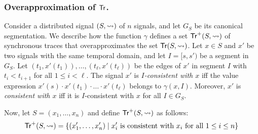 \subsubsection{Overapproximation of $\mathsf{Tr}$.}
Consider a distributed signal $(S,{\rightsquigarrow})$ of $n$ signals, and let $G_S$ be its canonical segmentation.
We describe how the function $\gamma$ defines a set $\mathsf{Tr}^+(S,{\rightsquigarrow})$ of synchronous traces that overapproximates the set $\mathsf{Tr}(S,{\rightsquigarrow})$.
%
%
%
Let $x \in S$ and $x'$ be two signals with the same temporal domain, and let $I = [s, s')$ be a segment in $G_S$.
Let $(t_1, x'(t_1)), \ldots, (t_\ell, x'(t_\ell))$ be the edges of $x'$ in segment $I$ with $t_i < t_{i+1}$ for all $1 \leq i < \ell$.
The signal $x'$ is \emph{$I$-consistent with $x$} iff the value expression $x'(s) \cdot x'(t_1) \cdot \ldots \cdot x'(t_\ell)$ belongs to $\gamma(x,I)$.
Moreover, $x'$ is \emph{consistent with $x$} iff it is $I$-consistent with $x$ for all $I \in G_S$.

Now, let $S = (x_1, \ldots, x_n)$ and define $\mathsf{Tr}^+(S,{\rightsquigarrow})$ as follows:
\[ \tr^+(S,{\hb}) = \{ (x_1', \ldots, x_n') \st \text{$x_i'$ is consistent with $x_i$ for all $1 \leq i \leq n$}\} \]



